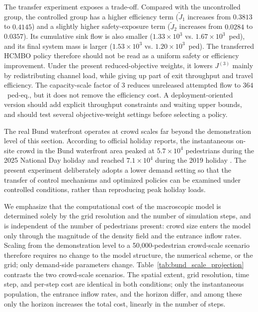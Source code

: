 \documentclass[lettersize,journal]{IEEEtran}
\begin{document}
The transfer experiment exposes a trade-off.
Compared with the uncontrolled group, the controlled group has a higher efficiency term ($\tilde J_1$ increases from $0.3813$ to $0.4145$) and a slightly higher safety-exposure term ($\tilde J_2$ increases from $0.0284$ to $0.0357$).
Its cumulative sink flow is also smaller ($1.33{\times}10^3$ vs. $1.67{\times}10^3$~ped), and its final system mass is larger ($1.53{\times}10^3$ vs. $1.20{\times}10^3$~ped).
The transferred HCMBO policy therefore should not be read as a uniform safety or efficiency improvement.
Under the present reduced-objective weights, it lowers $J^{(3)}$ mainly by redistributing channel load, while giving up part of exit throughput and travel efficiency.
The capacity-scale factor of $3$ reduces unreleased attempted flow to $364$~ped-eq., but it does not remove the efficiency cost.
A deployment-oriented version should add explicit throughput constraints and waiting upper bounds, and should test several objective-weight settings before selecting a policy.

The real Bund waterfront operates at crowd scales far beyond the demonstration level of this section.
According to official holiday reports, the instantaneous on-site crowd in the Bund waterfront area peaked at $5.7\times10^4$ pedestrians during the 2025 National Day holiday \cite{qq2025bund_holiday_peak} and reached $7.1\times10^4$ during the 2019 holiday \cite{chinanews2019bund_flow_guidance}.
The present experiment deliberately adopts a lower demand setting so that the transfer of control mechanisms and optimized policies can be examined under controlled conditions, rather than reproducing peak holiday loads.

We emphasize that the computational cost of the macroscopic model is determined solely by the grid resolution and the number of simulation steps, and is independent of the number of pedestrians present: crowd size enters the model only through the magnitude of the density field and the entrance inflow rates.
Scaling from the demonstration level to a 50,000-pedestrian crowd-scale scenario therefore requires no change to the model structure, the numerical scheme, or the grid; only demand-side parameters change.
Table~\ref{tab:bund_scale_projection} contrasts the two crowd-scale scenarios.
The spatial extent, grid resolution, time step, and per-step cost are identical in both conditions; only the instantaneous population, the entrance inflow rates, and the horizon differ, and among these only the horizon increases the total cost, linearly in the number of steps.
\end{document}
